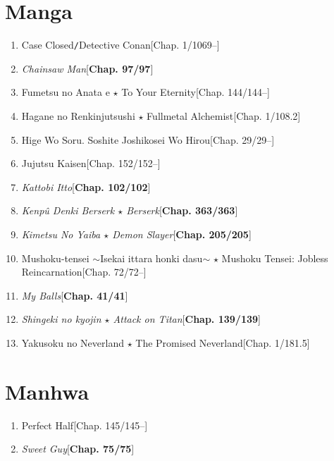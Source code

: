 \documentclass{article}
\numberwithin{equation}{section}
\begin{document}
\section{Manga}
\begin{enumerate}
    \item Case Closed\texttt{/}Detective Conan\hfill[Chap. 1/1069--]
    \item \textit{Chainsaw Man}\hfill[\textbf{Chap. 97/97}]
    \item Fumetsu no Anata e $\star$ To Your Eternity\hfill[Chap. 144/144--]
    \item Hagane no Renkinjutsushi $\star$ Fullmetal Alchemist\hfill[Chap. 1/108.2]
    \item Hige Wo Soru. Soshite Joshikosei Wo Hirou\hfill[Chap. 29/29--]
    \item Jujutsu Kaisen\hfill[Chap. 152/152--]
    \item \textit{Kattobi Itto}\hfill[\textbf{Chap. 102/102}]
    \item \textit{Kenp\^u Denki Berserk $\star$ Berserk}\hfill[\textbf{Chap. 363/363}]
    \item \textit{Kimetsu No Yaiba $\star$ Demon Slayer}\hfill[\textbf{Chap. 205/205}]
    \item Mushoku-tensei $\sim$Isekai ittara honki dasu$\sim$ $\star$ Mushoku Tensei: Jobless Reincarnation\hfill[Chap. 72/72--]
    \item \textit{My Balls}\hfill[\textbf{Chap. 41/41}]
    \item \textit{Shingeki no kyojin $\star$ Attack on Titan}\hfill[\textbf{Chap. 139/139}]
    \item Yakusoku no Neverland $\star$ The Promised Neverland\hfill[Chap. 1/181.5]
\end{enumerate}


\section{Manhwa}
\begin{enumerate}
    \item Perfect Half\hfill[Chap. 145/145--]
    \item \textit{Sweet Guy}\hfill[\textbf{Chap. 75/75}]
\end{enumerate}

\end{document}
